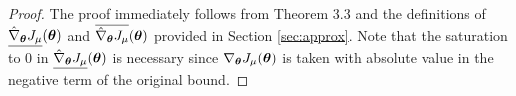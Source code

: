 \thirdtheorem*
\begin{proof}
The proof immediately follows from Theorem 3.3 and the definitions of $\gradDown{\vtheta}$ and $\gradUp{\vtheta}$ provided in Section \ref{sec:approx}. Note that the saturation to $0$ in $\gradDown{\vtheta}$ is necessary since $\gradJ{\vtheta}$ is taken with absolute value in the negative term of the original bound.
\end{proof}

\fourththeorem*
